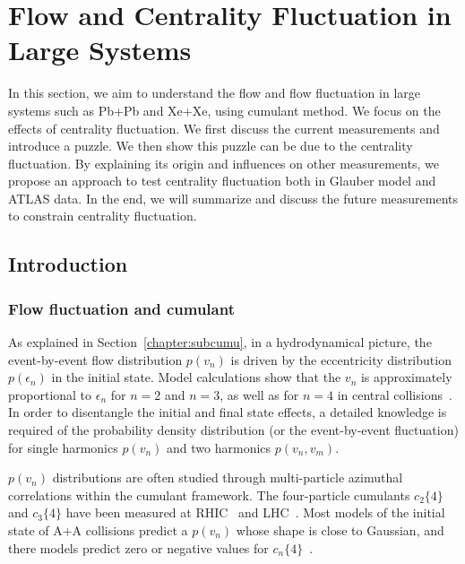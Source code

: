 \section{Flow and Centrality Fluctuation in Large Systems}
\label{chapter:centfluc}

In this section, we aim to understand the flow and flow fluctuation in large systems such as Pb+Pb and Xe+Xe, using cumulant method. We focus on the effects of centrality fluctuation. We first discuss the current measurements and introduce a puzzle. We then show this puzzle can be due to the centrality fluctuation. By explaining its origin and influences on other measurements, we propose an approach to test centrality fluctuation both in Glauber model and ATLAS data. In the end, we will summarize and discuss the future measurements to constrain centrality fluctuation.



\subsection{Introduction}

\subsubsection{Flow fluctuation and cumulant}

As explained in Section~\ref{chapter:subcumu}, in a hydrodynamical picture, the event-by-event flow distribution $p(v_n)$ is driven by the eccentricity distribution $p(\epsilon_n)$ in the initial state. Model calculations show that the $v_n$ is approximately proportional to $\epsilon_n$ for $n=2$ and $n=3$, as well as for $n=4$ in central collisions~\cite{Gardim:2011xv, Teaney:2010vd, Niemi:2012aj}. In order to disentangle the initial and final state effects, a detailed knowledge is required of the probability density distribution (or the event-by-event fluctuation) for single harmonics $p(v_n)$ and two harmonics $p(v_n, v_m)$.

$p(v_n)$ distributions are often studied through multi-particle azimuthal correlations within the cumulant framework. The four-particle cumulants $c_2\{4\}$ and $c_3\{4\}$ have been measured at RHIC~\cite{Adamczyk:2015obl} and LHC~\cite{Abelev:2014mda, Chatrchyan:2013nka, Sirunyan:2017pan}. Most models of the initial state of A+A collisions predict a $p(v_n)$ whose shape is close to Gaussian, and there models predict zero or negative values for $c_n\{4\}$~\cite{Yan:2013laa, Yan:2014nsa}.

